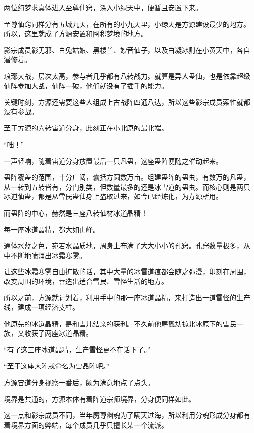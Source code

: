 
\begin{this_body}

两位纯梦求真体进入至尊仙窍，深入小绿天中，便暂且安置下来。

至尊仙窍同样分有五域九天，在所有的小九天里，小绿天是方源建设最少的地方。所以，这里就成了方源安置和囤积梦境的地方。

影宗成员影无邪、白兔姑娘、黑楼兰、妙音仙子，以及白凝冰则在小黄天中，各自潜修着。

琅琊大战，层次太高，参与者几乎都有八转战力。就算是异人蛊仙，也是依靠超级仙阵参加大战，仙阵一破，他们就没有了插手的能力。

关键时刻，方源还需要这些人组成上古战阵四通八达，所以这些影宗成员索性就都没有参战。

至于方源的六转宙道分身，此刻正在小北原的最北端。

“咄！”

一声轻响，随着宙道分身放置最后一只凡蛊，这座蛊阵便随之催动起来。

蛊阵覆盖的范围，十分广阔，囊括方圆数万亩。组建蛊阵的蛊虫，有数万的凡蛊，从一转到五转皆有，分门别类，但数量最多的还是冰雪道的蛊虫。而核心则是两只冰道仙蛊，都是从雪民蛊仙身上盗取过来，如今已经炼化，为方源所用。

而蛊阵的中心，赫然是三座八转仙材冰道晶精！

每一座冰道晶精，都大如山峰。

通体水蓝之色，宛若水晶质地，周身上布满了大大小小的孔窍。孔窍数量极多，从中不断地喷涌出冰霜寒雾。

让这些冰霜寒雾自由扩散的话，其中大量的冰雪道痕都会随之弥漫，印刻在周围，改变周围的环境，营造出适合雪民、雪怪生活的地方。

所以之前，方源就计划着，利用手中的那一座冰道晶精，来打造出一道雪怪的生产线，建成一项经济支柱。

他原先的冰道晶精，是和雪儿结亲的获利。不久前他屠戮劫掠北冰原下的雪民一族，又收获了两座冰道晶精。

“有了这三座冰道晶精，生产雪怪更不在话下了。”

“至于这座大阵就命名为雪晶阵吧。”

方源宙道分身视察一番后，颇为满意地点了点头。

境界是共通的，方源本体有着阵道宗师境界，分身便同样如此。

这一点和影宗成员不同，当年魔尊幽魂为了瞒天过海，所以利用分魂形成分身都有着境界方面的弊端，每个成员几乎只擅长某一个流派。


\end{this_body}
